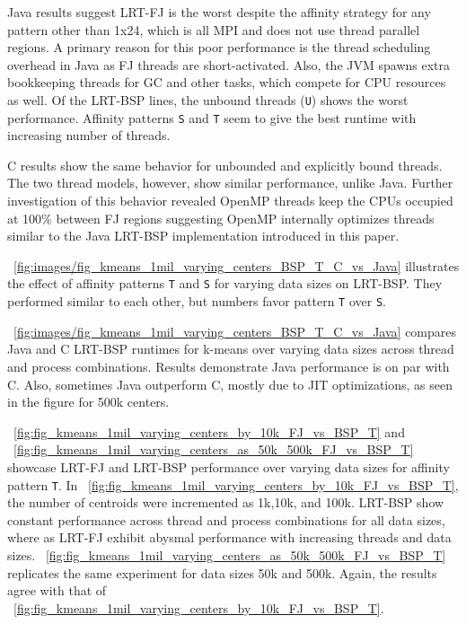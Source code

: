 \documentclass[10pt, conference, compsocconf]{IEEEtran}
\begin{document}
Java results suggest \ac{LRT-FJ} is the worst despite the affinity strategy for any pattern other than 1x24, which is all \ac{MPI} and does not use thread parallel regions. A primary reason for this poor performance is the thread scheduling overhead in Java as \ac{FJ} threads are short-activated. Also, the \ac{JVM} spawns extra bookkeeping threads for \ac{GC} and other tasks, which compete for \acs{CPU} resources as well. Of the \ac{LRT-BSP} lines, the unbound threads (\texttt{U}) shows the worst performance. Affinity patterns \texttt{S} and \texttt{T} seem to give the best runtime with increasing number of threads. 

C results show the same behavior for unbounded and explicitly bound threads. The two thread models, however, show similar performance, unlike Java. Further investigation of this behavior revealed OpenMP threads keep the \acsp{CPU} occupied at 100\% between \ac{FJ} regions suggesting OpenMP internally optimizes threads similar to the Java \ac{LRT-BSP} implementation introduced in this paper.

\figurename~\ref{fig:images/fig_kmeans_1mil_varying_centers_BSP_T_C_vs_Java} illustrates the effect of affinity patterns \texttt{T} and \texttt{S} for varying data sizes on \ac{LRT-BSP}. They performed similar to each other, but numbers favor pattern \texttt{T} over \texttt{S}.

\figurename~\ref{fig:images/fig_kmeans_1mil_varying_centers_BSP_T_C_vs_Java} compares Java and C \ac{LRT-BSP} runtimes for k-means over varying data sizes across thread and process combinations. Results demonstrate Java performance is on par with C. Also, sometimes Java outperform C, mostly due to \ac{JIT} optimizations, as seen in the figure for 500k centers. 

\figurename~\ref{fig:fig_kmeans_1mil_varying_centers_by_10k_FJ_vs_BSP_T} and \figurename~\ref{fig:fig_kmeans_1mil_varying_centers_as_50k_500k_FJ_vs_BSP_T} showcase \ac{LRT-FJ} and \ac{LRT-BSP} performance over varying data sizes for affinity pattern \texttt{T}. In \figurename~\ref{fig:fig_kmeans_1mil_varying_centers_by_10k_FJ_vs_BSP_T}, the number of centroids were incremented as 1k,10k, and 100k. \ac{LRT-BSP} show constant performance across thread and process combinations for all data sizes, where as \ac{LRT-FJ} exhibit abysmal performance with increasing threads and data sizes. \figurename~\ref{fig:fig_kmeans_1mil_varying_centers_as_50k_500k_FJ_vs_BSP_T} replicates the same experiment for data sizes 50k and 500k. Again, the results agree with that of \figurename~\ref{fig:fig_kmeans_1mil_varying_centers_by_10k_FJ_vs_BSP_T}.
\end{document}
